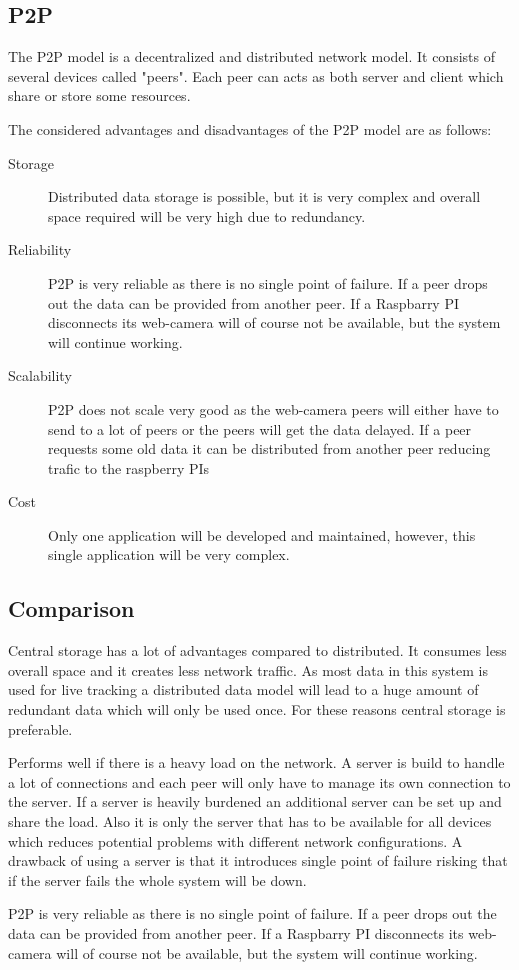 \subsection{P2P}
The P2P model is a decentralized and distributed network model. It consists of several devices called "peers". Each peer can acts as both server and client which share or store some resources.

The considered advantages and disadvantages of the P2P model are as follows:

\begin{description}
\item[Storage] Distributed data storage is possible, but it is very complex and overall space required will be very high due to redundancy.

\item[Reliability] P2P is very reliable as there is no single point of failure. If a peer drops out the data can be provided from another peer. If a Raspbarry PI disconnects its web-camera will of course not be available, but the system will continue working.

\item[Scalability] P2P does not scale very good as the web-camera peers will either have to send to a lot of peers or the peers will get the data delayed. If a peer requests some old data it can be distributed from another peer reducing trafic to the raspberry PIs

\item[Cost] Only one application will be developed and maintained, however, this single application will be very complex.
\end{description}

\subsection{Comparison}

\item[Storage] Central storage has a lot of advantages compared to distributed. It consumes less overall space and it creates less network traffic. As most data in this system is used for live tracking a distributed data model will lead to a huge amount of redundant data which will only be used once. For these reasons central storage is preferable.

\item[Reliability] Performs well if there is a heavy load on the network. A server is build to handle a lot of connections and each peer will only have to manage its own connection to the server. If a server is heavily burdened an additional server can be set up and share the load. Also it is only the server that has to be available for all devices which reduces potential problems with different network configurations. A drawback of using a server is that it introduces single point of failure risking that if the server fails the whole system will be down.


\item[Reliability] P2P is very reliable as there is no single point of failure. If a peer drops out the data can be provided from another peer. If a Raspbarry PI disconnects its web-camera will of course not be available, but the system will continue working.
